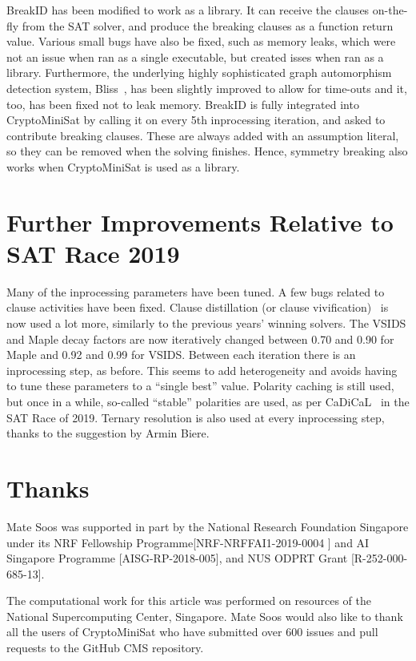 \documentclass[final]{ieee}
\begin{document}
BreakID has been modified to work as a library. It can receive the clauses on-the-fly from the SAT solver, and produce the breaking clauses as a function return value. Various small bugs have also be fixed, such as memory leaks, which were not an issue when ran as a single executable, but created isses when ran as a library. Furthermore, the underlying highly sophisticated graph automorphism detection system, Bliss~\cite{DBLP:conf/alenex/JunttilaK07}, has been slightly improved to allow for time-outs and it, too, has been fixed not to leak memory. BreakID is fully integrated into CryptoMiniSat by calling it on every 5th inprocessing iteration, and asked to contribute breaking clauses. These are always added with an assumption literal, so they can be removed when the solving finishes. Hence, symmetry breaking also works when CryptoMiniSat is used as a library.


\section{Further Improvements Relative to SAT Race 2019}
Many of the inprocessing parameters have been tuned. A few bugs related to clause activities have been fixed. Clause distillation (or clause vivification)~\cite{DBLP:journals/ai/LiXLMLL20} is now used a lot more, similarly to the previous years' winning solvers. The VSIDS and Maple decay factors are now iteratively changed between 0.70 and 0.90 for Maple and 0.92 and 0.99 for VSIDS. Between each iteration there is an inprocessing step, as before. This seems to add heterogeneity and avoids having to tune these parameters to a ``single best'' value. Polarity caching is still used, but once in a while, so-called ``stable'' polarities are used, as per CaDiCaL~\cite{cadical} in the SAT Race of 2019. Ternary resolution is also used at every inprocessing step, thanks to the suggestion by Armin Biere.


\section{Thanks}
Mate Soos was supported in part by the National Research Foundation Singapore under its NRF Fellowship Programme[NRF-NRFFAI1-2019-0004 ] and AI Singapore Programme [AISG-RP-2018-005],  and NUS ODPRT Grant [R-252-000-685-13].

The computational work for this article was performed on resources of the National Supercomputing Center, Singapore\cite{nscc}. Mate Soos would also like to thank all the users of CryptoMiniSat who have submitted over 600 issues and pull requests to the GitHub CMS repository\cite{CMS}.




\vfill
\pagebreak
\end{document}
